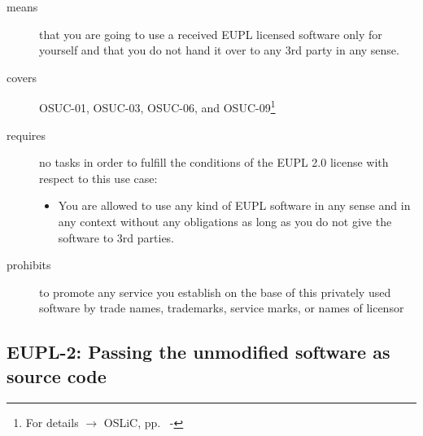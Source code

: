 \begin{description}
\item[means] that you are going to use a received EUPL licensed software only
for yourself and that you do not hand it over to any 3rd party in any sense.
\item[covers] OSUC-01, OSUC-03, OSUC-06, and OSUC-09\footnote{For details 
$\rightarrow$ OSLiC, pp.\ \pageref{OSUC-01-DEF} - \pageref{OSUC-09-DEF}}
\item[requires] no tasks in order to fulfill the conditions of the EUPL 2.0
license with respect to this use case:
  \begin{itemize}
    \item You are allowed to use any kind of EUPL software in any sense and in
    any context without any obligations as long as you do not give the software
    to 3rd parties.
  \end{itemize}
\item[prohibits] to promote any service you establish on the base of this
privately used software by trade names, trademarks, service marks, or names of
licensor
\end{description}

\subsection{EUPL-2: Passing the unmodified software as source code}
\label{OSUC-02-EUPL} \label{OSUC-05-EUPL} \label{OSUC-07-EUPL} 

